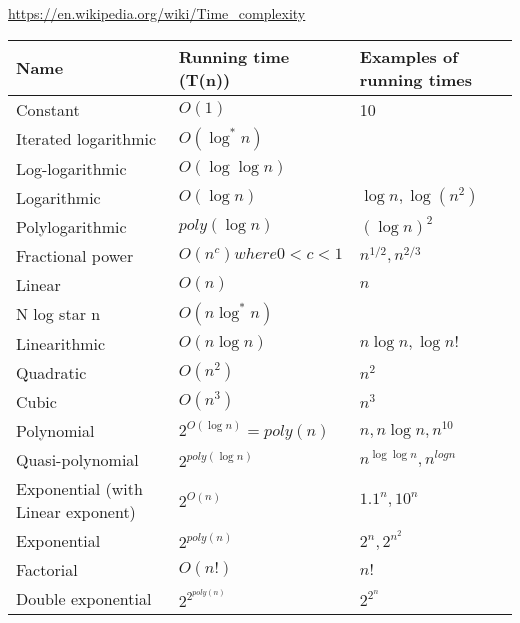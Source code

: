 \documentclass[english, 10pt]{article}
\begin{document}
\url{https://en.wikipedia.org/wiki/Time_complexity}
\begin{center}
    \begin{tabular}{lll}
        Name                 & Running time (T(n))        & Examples of running times        \\ \toprule
        Constant             & $ O(1)           $         & 10                               \\ \midrule
        Iterated logarithmic & $ O(\log^* n)      $       & \\ \midrule
        Log-logarithmic      & $ O(\log \log n)   $       & \\ \midrule
        Logarithmic          & $ O(\log n) $              & $ \log n, \log(n^2)$             \\ \midrule
        Polylogarithmic      & $ poly(\log n) $           & $ (\log n)^2  $                  \\ \midrule
        Fractional power     & $ O(n^c) where 0 < c < 1 $ & $ n^{1/2}, n^{2/3}$              \\ \midrule
        Linear               & $ O(n) $                   & $ n$                             \\ \midrule
        N log star n         & $ O(n \log^* n) $          & $   $                            \\ \midrule
        Linearithmic         & $ O(n \log n)$             & $  n \log n, \log n! $           \\ \midrule
        Quadratic            & $ O(n^2) $                 & $  n^2 $                         \\ \midrule
        Cubic                & $ O(n^3) $                 & $  n^3 $                         \\ \midrule
        Polynomial           & $ 2^{O(\log n)} = poly(n)$ & $  n, n\log n, n^{10} $          \\ \midrule
        Quasi-polynomial     & $ 2^{poly(\log n)} $       & $  n^{\log \log n}, n^{log n}$   \\ \midrule
        Exponential (with
        Linear exponent)     & $ 2^{O(n)} $               & $  1.1^n, 10^n $                 \\ \midrule
        Exponential          & $ 2^{poly(n)} $            & $   2^n, 2^{n^2}  $              \\ \midrule
        Factorial            & $ O(n!) $                  & $  n!$                           \\ \midrule
        Double exponential   & $ 2^{2^{poly(n)}} $        & $  2^{2^n}$                    \\
        \bottomrule
    \end{tabular}
\end{center}
\end{document}
